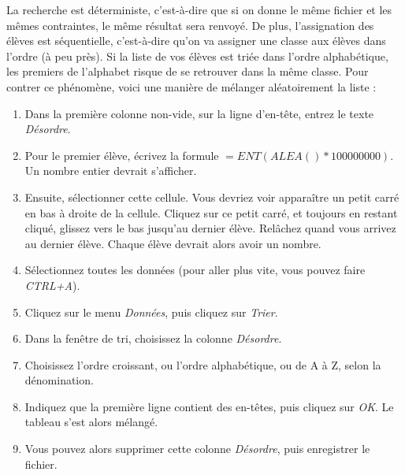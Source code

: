 \documentclass[11pt,a4paper]{article}
\begin{document}
\begin{astuce}
  La recherche est déterministe, c'est-à-dire que si on donne le même fichier et les mêmes contraintes, le même résultat sera renvoyé. De plus, l'assignation des élèves est séquentielle, c'est-à-dire qu'on va assigner une classe aux élèves dans l'ordre (à peu près). Si la liste de vos élèves est triée dans l'ordre alphabétique, les premiers de l'alphabet risque de se retrouver dans la même classe. Pour contrer ce phénomène, voici une manière de mélanger aléatoirement la liste :
  \begin{enumerate}
    \item Dans la première colonne non-vide, sur la ligne d'en-tête, entrez le texte \textit{Désordre}.
    \item Pour le premier élève, écrivez la formule $=ENT(ALEA()*100000000)$. Un nombre entier devrait s'afficher.
    \item Ensuite, sélectionner cette cellule. Vous devriez voir apparaître un petit carré en bas à droite de la cellule. Cliquez sur ce petit carré, et toujours en restant cliqué, glissez vers le bas jusqu'au dernier élève. Relâchez quand vous arrivez au dernier élève. Chaque élève devrait alors avoir un nombre.
    \item Sélectionnez toutes les données (pour aller plus vite, vous pouvez faire \textit{CTRL+A}).
    \item Cliquez sur le menu \textit{Données}, puis cliquez sur \textit{Trier}.
    \item Dans la fenêtre de tri, choisissez la colonne \textit{Désordre}.
    \item Choisissez l'ordre croissant, ou l'ordre alphabétique, ou de A à Z, selon la dénomination.
    \item Indiquez que la première ligne contient des en-têtes, puis cliquez sur \textit{OK}. Le tableau s'est alors mélangé.
    \item Vous pouvez alors supprimer cette colonne \textit{Désordre}, puis enregistrer le fichier.
  \end{enumerate}
\end{astuce}
\end{document}
